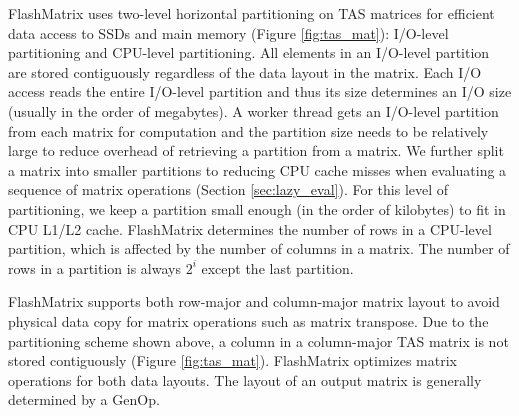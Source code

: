 FlashMatrix uses two-level horizontal partitioning on TAS matrices for efficient
data access to SSDs and main memory (Figure \ref{fig:tas_mat}): I/O-level
partitioning and CPU-level partitioning. All elements in an I/O-level partition
are stored contiguously regardless of the data layout in the matrix. Each I/O
access reads the entire I/O-level partition and thus its size determines an I/O
size (usually in the order of megabytes). A worker thread gets an I/O-level
partition from each matrix for
computation and the partition size needs to be relatively large to reduce overhead
of retrieving a partition from a matrix. We further split a matrix into smaller
partitions to reducing CPU cache misses when evaluating a sequence of matrix
operations (Section \ref{sec:lazy_eval}). For this level of partitioning, we keep
a partition small enough (in the order of kilobytes) to fit in CPU L1/L2 cache.
FlashMatrix determines the number of rows in a CPU-level partition, which is
affected by the number of columns in a matrix. The number of rows in a partition
is always $2^i$ except the last partition.


FlashMatrix supports both row-major and column-major matrix layout to avoid
physical data copy for matrix operations such as matrix transpose. Due to
the partitioning scheme shown above, a column in a column-major TAS matrix
is not stored contiguously (Figure \ref{fig:tas_mat}). FlashMatrix optimizes
matrix operations for both data layouts.
The layout of an output matrix is generally determined by a GenOp.


